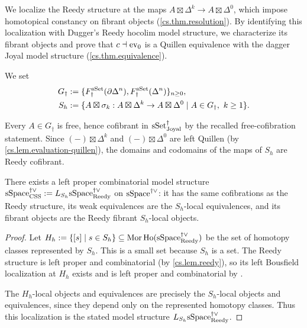 \documentclass[a4paper,dvipdfmx,11pt]{amsart}
\begin{document}
We localize the Reedy structure at the maps $A\boxtimes\Delta^k\to A\boxtimes\Delta^0$, which impose homotopical constancy on fibrant objects (\cref{cs.thm.resolution}).
By identifying this localization with Dugger's Reedy hocolim model structure, we characterize its fibrant objects and prove that $c\dashv\mathrm{ev}_0$ is a Quillen equivalence with the dagger Joyal model structure (\cref{cs.thm.equivalence}).

\begin{notation}\label{cs.not.Gh}
  We set
  \begin{align}
    G_{\dag}
    &:=\{F_{\dag}^{\mathrm{sSet}}(\partial\Delta^n),F_{\dag}^{\mathrm{sSet}}(\Delta^n)\}_{n\geq0},\\
    S_{h}
    &:=\{A\boxtimes\sigma_k : A\boxtimes\Delta^k\to A\boxtimes\Delta^0 \mid A\in G_{\dag},\ k\geq1\}.
  \end{align}
\end{notation}

\begin{remark}
  Every $A\in G_{\dag}$ is free, hence cofibrant in $\mathrm{sSet}^{\dag}_{\mathrm{Joyal}}$ by the recalled free-cofibration statement.
  Since $(-)\boxtimes\Delta^k$ and $(-)\boxtimes\Delta^0$ are left Quillen (by \cref{cs.lem.evaluation-quillen}), the domains and codomains of the maps of $S_h$ are Reedy cofibrant.
\end{remark}

\begin{lemma}\label{cs.def.Sh}
  There exists a left proper combinatorial model structure $\mathrm{sSpace}^{\dag\vee}_{\mathrm{CSS}}:=L_{S_h}\mathrm{sSpace}^{\dag\vee}_{\mathrm{Reedy}}$ on $\mathrm{sSpace}^{\dag\vee}$: 
  it has the same cofibrations as the Reedy structure, its weak equivalences are the $S_h$-local equivalences, and its fibrant objects are the Reedy fibrant $S_h$-local objects.
\end{lemma}

\begin{proof}
  Let $H_h:=\{[s]\mid s\in S_h\} \subseteq \operatorname{Mor}\mathrm{Ho}(\mathrm{sSpace}^{\dag\vee}_{\mathrm{Reedy}})$ be the set of homotopy classes represented by $S_h$.
  This is a small set because $S_h$ is a set.
  The Reedy structure is left proper and combinatorial (by \cref{cs.lem.reedy}), so its left Bousfield localization at $H_h$ exists and is left proper and combinatorial by \cite[Theorem~4.7]{Bar10}.
  
  The $H_h$-local objects and equivalences are precisely the $S_h$-local objects and equivalences, since they depend only on the represented homotopy classes.
  Thus this localization is the stated model structure $L_{S_h}\mathrm{sSpace}^{\dag\vee}_{\mathrm{Reedy}}$.
\end{proof}
\end{document}
